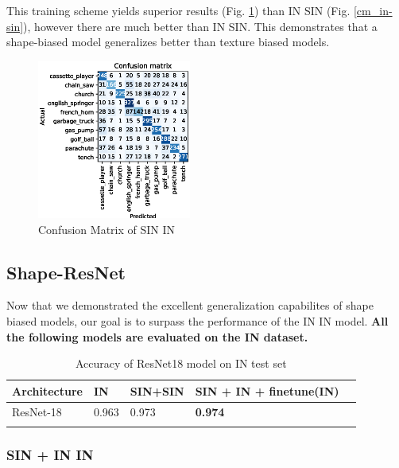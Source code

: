 \documentclass{article}
\begin{document}
This training scheme yields superior results (Fig. \ref{cm_sin-in}) than IN \texorpdfstring{\textrightarrow} .SIN (Fig. \ref{cm_in-sin}), however
there are much better than IN \texorpdfstring{\textrightarrow} .SIN.
This demonstrates that a shape-biased model generalizes better than texture biased models.

\begin{figure}[h!]
  \includegraphics[width = 0.45\textwidth]{imgs/sin/sin-in/sin-in_confusion_matrix_0.624.eps}
  \caption{Confusion Matrix of SIN \texorpdfstring{\textrightarrow} .IN}
  \label{cm_sin-in}
\end{figure}

\subsection{Shape-ResNet}

Now that we demonstrated the excellent generalization capabilites of shape biased models,
our goal is to surpass the performance of the IN \texorpdfstring{\textrightarrow} .IN model.
\textbf{All the following models are evaluated on the IN dataset.}

\begin{table}[h!]
  \begin{tabular}{lllll}
  \Xhline{2\arrayrulewidth}
  Architecture & IN & SIN+SIN  & SIN + IN + finetune(IN) \\ \hline
  ResNet-18    & 0.963    & 0.973   & \textbf{0.974}    \\ \Xhline{2\arrayrulewidth}
  \end{tabular}
  \caption{Accuracy of ResNet18 model on IN test set}
\end{table}


\subsubsection{SIN + IN \texorpdfstring{\textrightarrow} .IN}
\end{document}
